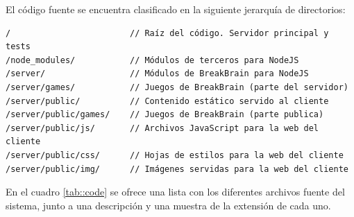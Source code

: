 El código fuente se encuentra clasificado en la siguiente jerarquía de directorios:

\begin{verbatim}
/                        // Raíz del código. Servidor principal y tests
/node_modules/           // Módulos de terceros para NodeJS 
/server/                 // Módulos de BreakBrain para NodeJS
/server/games/           // Juegos de BreakBrain (parte del servidor)
/server/public/          // Contenido estático servido al cliente
/server/public/games/    // Juegos de BreakBrain (parte publica)
/server/public/js/       // Archivos JavaScript para la web del cliente
/server/public/css/      // Hojas de estilos para la web del cliente
/server/public/img/      // Imágenes servidas para la web del cliente
\end{verbatim}

En el cuadro \ref{tab::code} se ofrece una lista con los diferentes archivos fuente del sistema, junto a una descripción y una muestra de la extensión de cada uno.

